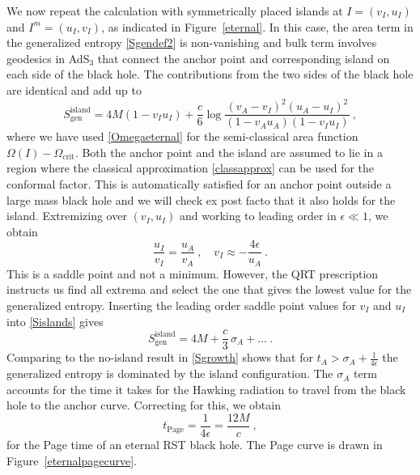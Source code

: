 \documentclass[12pt,a4paper]{article}
\newcommand{\be}{\begin{equation}}
\newcommand{\ee}{\end{equation}}
\newcommand{\f}[2]{\frac{#1}{#2}}
\begin{document}
We now repeat the calculation with symmetrically placed islands at $I=( v_I,  u_I)$ and $I^m = (u_I,v_I)$, as indicated in Figure~\ref{eternal}. In this case, the area term in the generalized entropy \eqref{Sgendef2} is non-vanishing and bulk term involves geodesics in AdS$_3$ that connect the anchor point and corresponding island on each side of the black hole. The contributions from the two sides of the black hole are identical and add up to 
\be\label{Sislands}
S_\text{gen}^\text{island} = 4M(1- v_I  u_I) +\f{c}{6}\log\f{(v_A- v_I)^2(u_A-u_I)^2}{(1-v_Au_A)(1- v_I  u_I)}~,
\ee
where we have used \eqref{Omegaeternal} for the semi-classical area function $\Omega(I)-\Omega_\text{crit}$. Both the anchor point and the island are assumed to lie in a region where the classical approximation \eqref{classapprox} can be used for the conformal factor. This is automatically satisfied for an anchor point outside a large mass black hole and we will check ex post facto that it also holds for the island.
Extremizing over $(v_I,u_I)$ and working to leading order in $\epsilon\ll 1$, we obtain
\be
\label{vIuIeternal}
\f{u_I}{v_I} = \f{u_A}{v_A}~,\quad v_I \approx -\f{4\epsilon}{u_A}~.
\ee
This is a saddle point and not a minimum. However, the QRT prescription instructs us find all extrema and select the one that gives the lowest value for the generalized entropy. 
Inserting the leading order saddle point values for $v_I$ and $u_I$ into \eqref{Sislands} gives 
\be\label{eternalafterpage}
S_\text{gen}^\text{island}=4M + \f{c}3 \,\sigma_A+\ldots~.
\ee
Comparing to the no-island result in \eqref{Sgrowth} shows that for $t_A>\sigma_A + \f1{4\epsilon}$ the generalized entropy is dominated by the island configuration. The $\sigma_A$ term accounts for the time it takes for the Hawking radiation to travel from the black hole to the anchor curve. Correcting for this, we obtain
\be\label{eternalpagetime}
t_\text{Page} = \frac1{4\epsilon}=\f{12M}{c} \>,
\ee
for the Page time of an eternal RST black hole. The Page curve is drawn in Figure~\ref{eternalpagecurve}.
\end{document}
